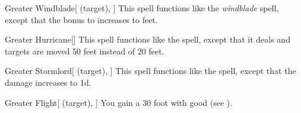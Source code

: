 \lowercase{\hypertarget{spell:Greater Windblade}{}}\label{spell:Greater Windblade}
\begin{attuneability}[\nth{5}]{\hypertarget{spell:Greater Windblade}{Greater Windblade}}[ (target), ]
This spell functions like the \textit{windblade} spell, except that the bonus to  increases to  feet.
\end{attuneability}
\vspace{0.25em}



\lowercase{\hypertarget{spell:Greater Hurricane}{}}\label{spell:Greater Hurricane}
\begin{freeability}[\nth{6}]{\hypertarget{spell:Greater Hurricane}{Greater Hurricane}}[]
This spell functions like the  spell, except that it deals  and targets are moved 50 feet instead of 20 feet.
\end{freeability}
\vspace{0.25em}



\lowercase{\hypertarget{spell:Greater Stormlord}{}}\label{spell:Greater Stormlord}
\begin{attuneability}[\nth{6}]{\hypertarget{spell:Greater Stormlord}{Greater Stormlord}}[ (target), ]
This spell functions like the  spell, except that the damage increases to  \plus1d.
\end{attuneability}
\vspace{0.25em}



\lowercase{\hypertarget{spell:Greater Flight}{}}\label{spell:Greater Flight}
\begin{attuneability}[\nth{7}]{\hypertarget{spell:Greater Flight}{Greater Flight}}[ (target), ]
You gain a 30 foot  with good  (see ).
\end{attuneability}
\vspace{0.25em}


